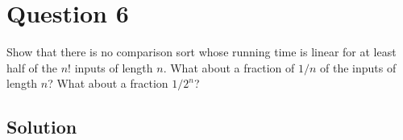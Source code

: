 
\section*{Question 6}

Show that there is no comparison sort whose running time is linear for at least half of the $n!$ inputs of length $n$. What about a fraction of $1/n$ of the inputs of length $n$? What about a fraction $1/2^n$?

\subsection*{Solution}

